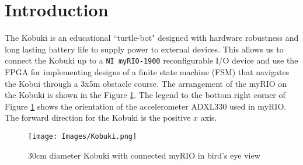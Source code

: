 \section{Introduction}
The Kobuki is an educational ``turtle-bot" designed with hardware robustness and long lasting battery life to supply power to external devices. This allows us to connect the Kobuki up to a \texttt{NI myRIO-1900} reconfigurable I/O device and use the FPGA for implementing designs of a finite state machine (FSM) that navigates the Kobui through a 3x5m obstacle course. The arrangement of the myRIO on the Kobuki is shown in the Figure \ref{fig:kobuki}. The legend to the bottom right corner of Figure \ref{fig:kobuki} shows the orientation of the accelerometer ADXL330 used in myRIO. The forward direction for the Kobuki is the positive $x$ axis. 
\begin{figure}[H]
    \centering
    \texttt{[image: Images/Kobuki.png]}
    \caption{30cm diameter Kobuki with connected myRIO in bird's eye view}
    \label{fig:kobuki}
\end{figure}

